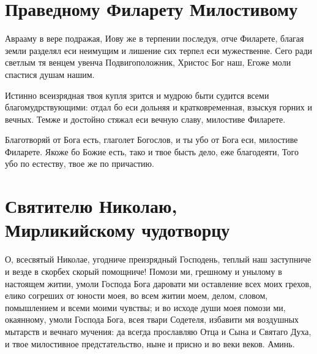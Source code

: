 \section{Праведному Филарету Милостивому}\begin{mymulticols}




Аврааму в вере подражая, Иову же в терпении последуя, отче Филарете, благая земли разделял еси неимущим и лишение сих терпел еси мужественне. Сего ради светлым тя венцем увенча Подвигоположник, Христос Бог наш, Егоже моли спастися душам нашим.



Истинно всеизрядная твоя купля зрится и мудрою быти судится всеми благомудрствующими: отдал бо еси дольняя и кратковременная, взыскуя горних и вечных. Темже и достойно стяжал еси вечную славу, милостиве Филарете.




Благотворяй от Бога есть, глаголет Богослов, и ты убо от Бога еси, милостиве Филарете. Якоже бо Божие есть, тако и твое бысть дело, еже благодеяти, Того убо по естеству, твое же по причастию.



\end{mymulticols}

\section{Святителю Николаю, Мирликийскому чудотворцу}\begin{mymulticols}




О, всесвятый Николае, угодниче преизрядный Господень, теплый наш заступниче и везде в скорбех скорый помощниче! Помози ми, грешному и унылому в настоящем житии, умоли Господа Бога даровати ми оставление всех моих грехов, елико согреших от юности моея, во всем житии моем, делом, словом, помышлением и всеми моими чувствы; и во исходе души моея помози ми, окаянному, умоли Господа Бога, всея твари Содетеля, избавити мя воздушных мытарств и вечнаго мучения: да всегда прославляю Отца и Сына и Святаго Духа, и твое милостивное предстательство, ныне и присно и во веки веков. Аминь.

\end{mymulticols}

